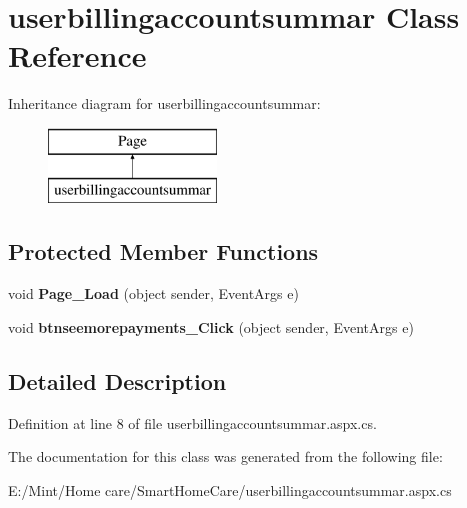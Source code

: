 \hypertarget{classuserbillingaccountsummar}{\section{userbillingaccountsummar Class Reference}
\label{classuserbillingaccountsummar}
}
Inheritance diagram for userbillingaccountsummar\-:\begin{figure}[H]
\begin{center}
\leavevmode
\includegraphics[height=2.000000cm]{classuserbillingaccountsummar}
\end{center}
\end{figure}
\subsection*{Protected Member Functions}
\begin{DoxyCompactItemize}
\item 
\hypertarget{classuserbillingaccountsummar_aae24de1f8e604fcf40f240c563da6fc0}{void {\bfseries Page\-\_\-\-Load} (object sender, Event\-Args e)}\label{classuserbillingaccountsummar_aae24de1f8e604fcf40f240c563da6fc0}

\item 
\hypertarget{classuserbillingaccountsummar_a4eade8d56a011431131bfa213daa2578}{void {\bfseries btnseemorepayments\-\_\-\-Click} (object sender, Event\-Args e)}\label{classuserbillingaccountsummar_a4eade8d56a011431131bfa213daa2578}

\end{DoxyCompactItemize}


\subsection{Detailed Description}


Definition at line 8 of file userbillingaccountsummar.\-aspx.\-cs.



The documentation for this class was generated from the following file\-:\begin{DoxyCompactItemize}
\item 
E\-:/\-Mint/\-Home care/\-Smart\-Home\-Care/userbillingaccountsummar.\-aspx.\-cs\end{DoxyCompactItemize}
